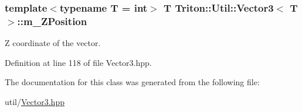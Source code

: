 \subsubsection[{m\+\_\+\+Z\+Position}]{\setlength{\rightskip}{0pt plus 5cm}template$<$typename T = int$>$ T {\bf Triton\+::\+Util\+::\+Vector3}$<$ T $>$\+::m\+\_\+\+Z\+Position}\label{class_triton_1_1_util_1_1_vector3_ac42aa6f29ac37a866b49cbc1d8e66f74}


Z coordinate of the vector. 



Definition at line 118 of file Vector3.\+hpp.



The documentation for this class was generated from the following file\+:\begin{DoxyCompactItemize}
\item 
util/\hyperlink{_vector3_8hpp}{Vector3.\+hpp}\end{DoxyCompactItemize}

